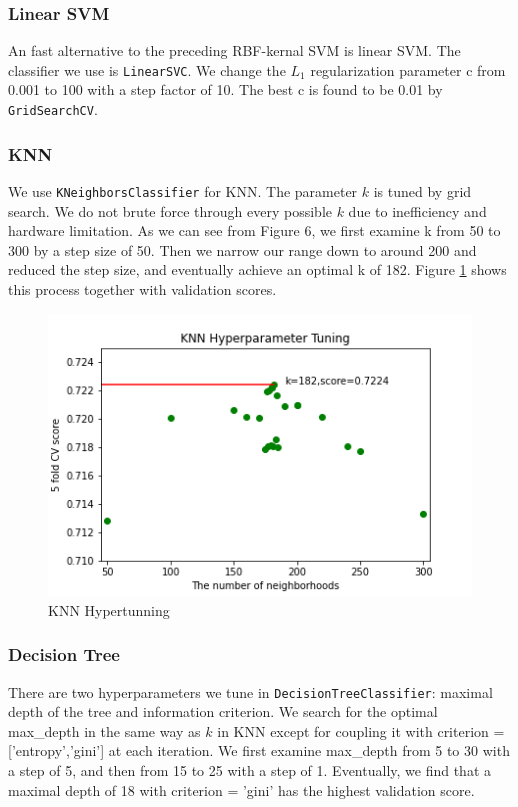 \documentclass[10pt,twocolumn,letterpaper]{article}
\begin{document}
	\subsubsection{Linear SVM}
	An fast alternative to the preceding RBF-kernal SVM is linear SVM. The classifier we use is \texttt{LinearSVC}. We change the $L_1$ regularization parameter c from 0.001 to 100 with a step factor of 10. The best c is found to be 0.01 by \texttt{GridSearchCV}.
	\subsubsection{KNN}
	We use \texttt{KNeighborsClassifier} for KNN. The parameter $k$ is tuned by grid search. We do not brute force through every possible $k$ due to inefficiency and hardware limitation. As we can see from Figure 6, we first examine k from 50 to 300 by a step size of 50. Then we narrow our range down to around 200 and reduced the step size, and eventually achieve an optimal k of 182. Figure \ref{KNN_hyper_tune} shows this process together with validation scores. 
	\begin{figure}[H]
		\includegraphics[width=\columnwidth]{KNN_hyper_tune}
		\caption{KNN Hypertunning}\label{KNN_hyper_tune}
	\end{figure}
	\subsubsection{Decision Tree}
	There are two hyperparameters we tune in \texttt{DecisionTreeClassifier}: maximal depth of the tree and information criterion. We search for the optimal max\_depth in the same way as $k$ in KNN except for coupling it with criterion = ['entropy','gini'] at each iteration. We first examine max\_depth from 5 to 30 with a step of 5, and then from 15 to 25 with a step of 1. Eventually, we find that a maximal depth of 18 with criterion = 'gini' has the highest validation score.
\end{document}
